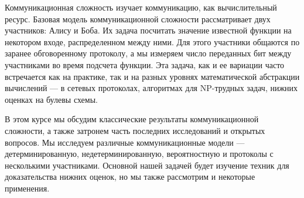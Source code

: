 Коммуникационная сложность изучает коммуникацию, как вычислительный ресурс. Базовая модель
коммуникационной сложности рассматривает двух участников: Алису и Боба. Их задача посчитать значение
известной функции на некотором входе, распределенном между ними. Для этого участники общаются по заранее
обговоренному протоколу, а мы измеряем число переданных бит между участниками во время подсчета
функции. Эта задача, как и ее вариации часто встречается как на практике, так и на разных уровнях
математической абстракции вычислений --- в сетевых протоколах, алгоритмах для NP-трудных задач, нижних
оценках на булевы схемы.

В этом курсе мы обсудим классические результаты коммуникационной сложности, а также затронем часть
последних исследований и открытых вопросов. Мы исследуем различные коммуникационные модели ---
детерминированную, недетерминированную, вероятностную и протоколы с несколькими участниками. Основной
нашей задачей будет изучение техник для доказательства нижних оценок, но мы также рассмотрим и некоторые
применения.